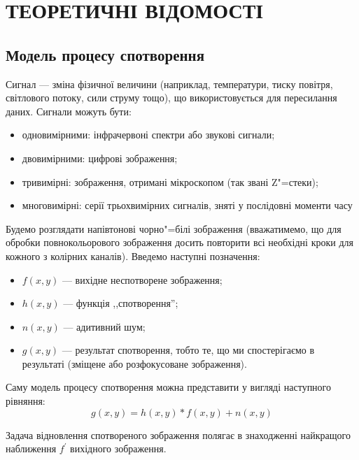 \documentclass{diploma}
\begin{document}
\chapter{ТЕОРЕТИЧНІ ВІДОМОСТІ}
  \section{Модель процесу спотворення}
    Сигнал --- зміна фізичної величини (наприклад, температури, тиску
    повітря, світлового потоку, сили струму тощо), що використовується для
    пересилання даних.
    Сигнали можуть бути:
    \begin{itemize}
      \item одновимірними: інфрачервоні спектри або звукові сигнали;
      \item двовимірними: цифрові зображення;
      \item тривимірні: зображення, отримані мікроскопом (так звані
        Z"=стеки);
      \item многовимірні: серії трьохвимірних сигналів, зняті у
        послідовні моменти часу
    \end{itemize}

    Будемо розглядати напівтонові чорно"=білі зображення (вважатимемо, що для
    обробки повнокольорового зображення досить повторити всі необхідні кроки
    для кожного з колірних каналів).
    Введемо наступні позначення:
    \begin{itemize}
      \item $f\left( x, y \right)$ --- вихідне неспотворене зображення;
      \item $h\left( x, y \right)$ --- функція ,,спотворення'';
      \item $n\left( x, y \right)$ --- адитивний шум;
      \item $g\left( x, y \right)$ --- результат спотворення, тобто те, що ми
        спостерігаємо в результаті (зміщене або розфокусоване зображення).
    \end{itemize}

    Саму модель процесу спотворення можна представити у вигляді наступного
    рівняння:
    \begin{equation}
      g\left( x, y \right) = h\left( x, y \right) \ast f\left( x, y \right) +
      n\left( x, y \right)
      \label{eq:model}
    \end{equation}

    Задача відновлення спотвореного зображення полягає в знаходженні
    найкращого наближення $f^\prime$ вихідного зображення.
\end{document}
